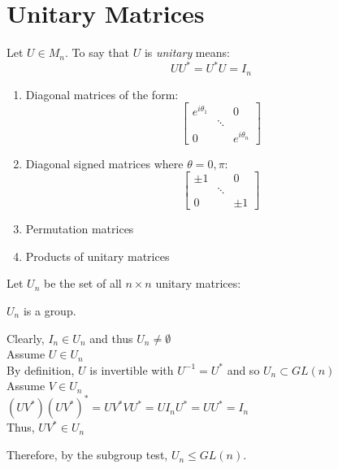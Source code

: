 \documentclass[letterpaper,12pt,fleqn]{article}
\renewcommand{\o}{\theta}
\begin{document}
\section*{Unitary Matrices}

\begin{definition}[Unitary]
  Let $U\in M_n$. To say that $U$ is \emph{unitary} means:
  \[UU^*=U^*U=I_n\]
\end{definition}

\begin{example}
  \listbreak
  \begin{enumerate}
  \item Diagonal matrices of the form:
    \[\begin{bmatrix} e^{i\o_1} & & 0 \\
    & \ddots & \\
    0 & & e^{i\o_n}\end{bmatrix}\]

  \item Diagonal signed matrices where $\o=0,\pi$:
    \[\begin{bmatrix} \pm1 & & 0 \\
    & \ddots & \\
    0 & & \pm1 \end{bmatrix}\]

  \item Permutation matrices

  \item Products of unitary matrices
  \end{enumerate}
\end{example}

\begin{theorem}
  Let $U_n$ be the set of all $n\times n$ unitary matrices:

  $U_n$ is a group.
\end{theorem}

\begin{theproof}
  Clearly, $I_n\in U_n$ and thus $U_n\ne\emptyset$ \\
  Assume $U\in U_n$ \\
  By definition, $U$ is invertible with $U^{-1}=U^*$ and so
  $U_n\subset GL(n)$ \\
  Assume $V\in U_n$ \\
  $(UV^*)(UV^*)^*=UV^*VU^*=UI_nU^*=UU^*=I_n$ \\
  Thus, $UV^*\in U_n$

  Therefore, by the subgroup test, $U_n\le GL(n)$.
\end{theproof}
\end{document}
